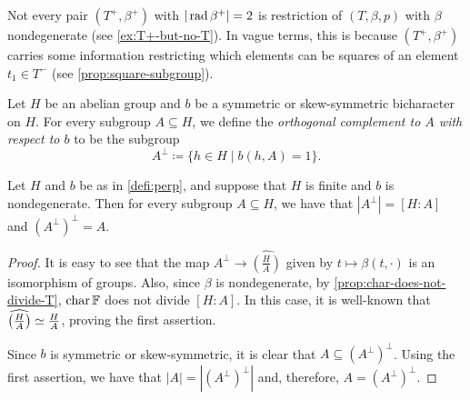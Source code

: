 

Not every pair $(T^+, \beta^+)$ with $|\operatorname{rad} \beta^+| = 2$ is restriction of $(T, \beta, p)$ with $\beta$ nondegenerate (see \cref{ex:T+-but-no-T}). 
In vague terms, this is because $(T^+, \beta^+)$ carries some information restricting which elements can be squares of an element $t_1 \in T^-$ (see \cref{prop:square-subgroup}). 

\begin{defi}\label{defi:perp}
    Let $H$ be an abelian group and $b$ be a symmetric or skew-symmetric bicharacter on $H$. 
    For every subgroup $A \subseteq H$, we define the \emph{orthogonal complement to $A$ with respect to $b$} to be the subgroup
    \[
        A^\perp \coloneqq \{ h\in H \mid b(h, A) = 1 \}.
    \]
\end{defi}

\begin{lemma}\label{lemma:perp-perp}
    Let $H$ and $b$ be as in \cref{defi:perp}, and suppose that $H$ is finite and $b$ is nondegenerate. 
    Then for every subgroup $A \subseteq H$, we have that $|A^\perp| = [H : A]$ and $(A^\perp)^\perp = A$.
\end{lemma}

\begin{proof}
    It is easy to see that the map $A^\perp \to \widehat{\left( \frac{H}{A}\right)}$ given by $t \mapsto \beta(t, \cdot)$ is an isomorphism of groups. 
    Also, since $\beta$ is nondegenerate, by \cref{prop:char-does-not-divide-T},  $\operatorname{char} \mathbb{F}$ does not divide $[H : A]$. 
    In this case, it is well-known that $\widehat{\left( \frac{H}{A}\right)} \simeq \frac{H}{A}$, proving the first assertion.

    Since $b$ is symmetric or skew-symmetric, it is clear that $A \subseteq (A^\perp)^\perp$. 
    Using the first assertion, we have that $|A| = |(A^\perp)^\perp|$ and, therefore, $A = (A^\perp)^\perp$.
\end{proof}

